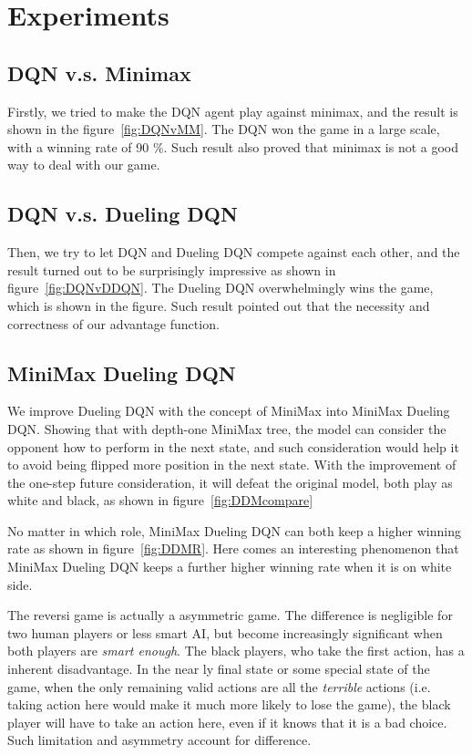 \documentclass[10pt,twocolumn,letterpaper]{article}
\begin{document}
\section{Experiments}

\subsection{DQN v.s. Minimax}
Firstly, we tried to make the DQN agent play against minimax, and the result is shown in the figure~\ref{fig:DQNvMM}.
The DQN won the game in a large scale, with a winning rate of 90 \%. Such result also proved that minimax is not a good way to deal with our game.


\subsection{DQN v.s. Dueling DQN}
Then, we try to let DQN and Dueling DQN compete against each other, and the result turned out to be surprisingly impressive as shown in figure~\ref{fig:DQNvDDQN}. The Dueling DQN overwhelmingly wins the game, which is shown in the figure. Such result pointed out that the necessity and correctness of our advantage function.


\subsection{MiniMax Dueling DQN}
We improve Dueling DQN with the concept of MiniMax into MiniMax Dueling DQN. Showing that with depth-one MiniMax tree, the model can consider the opponent how to perform in the next state, and such consideration would help it to avoid being flipped more position in the next state. With the improvement of the one-step future consideration, it will defeat the original model, both play as white and black, as shown in figure~\ref{fig:DDMcompare}



No matter in which role, MiniMax Dueling DQN can both keep a higher winning rate as shown in figure~\ref{fig:DDMR}. Here comes an interesting phenomenon that MiniMax Dueling DQN keeps a further higher winning rate when it is on white side.
 
 
  The reversi game is actually a asymmetric game. The difference is negligible for two human players or less smart AI, but become increasingly significant when both players are \emph{smart enough}. The black players, who take the first action, has a inherent disadvantage. In the near ly final state or some special state of the game, when the only remaining valid actions
are all the \emph{terrible} actions (i.e. taking action here would make it much more likely to lose the game),
the black player will have to take an action here, even if it knows that it is a bad choice. Such limitation and asymmetry account for difference.
\end{document}
